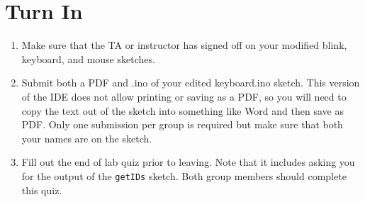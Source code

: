 \section{Turn In}
\begin{enumerate}
    \item Make sure that the TA or instructor has signed off on your modified blink, keyboard, and mouse sketches.
    \item Submit both a PDF and .ino of your edited keyboard.ino sketch. 
            This version of the IDE does not allow printing or saving as a PDF, so you will need to copy the 
            text out of the sketch into something like Word and then save as PDF. Only one 
            submission per group is required but make sure that both your names are on the sketch.
    \item Fill out the end of lab quiz prior to leaving. Note that it includes asking you 
            for the output of the \lstinline$getIDs$ sketch. Both group members should complete
            this quiz.
\end{enumerate}
